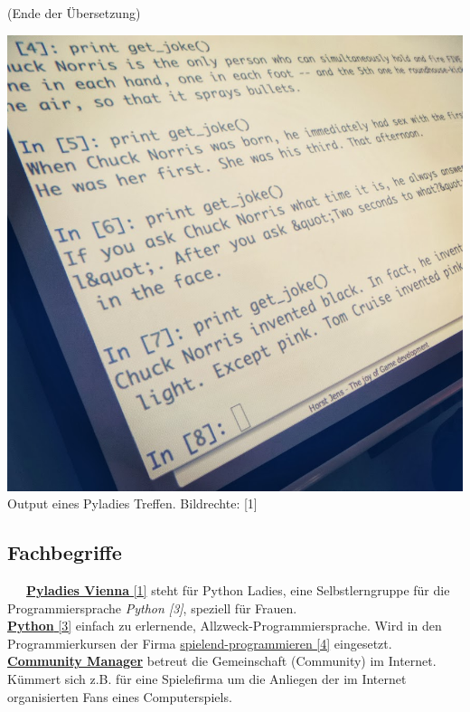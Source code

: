 \documentclass[10pt,a4paper,ngerman,twoside]{article} %
\begin{document}
\begin{multicols}{3}
(Ende der Übersetzung)
\begin{center}
\includegraphics[width=\linewidth]{floor/floor-jokes.jpg} \\
\footnotesize{Output eines Pyladies Treffen. Bildrechte: [1]} 
\end{center}
\subsection*{Fachbegriffe}

~~~\href{https://twitter.com/pyladies_vie}{\textbf{Pyladies Vienna} [1]} steht für Python Ladies, eine Selbstlerngruppe für die Programmiersprache  \textit{Python [3]}, speziell für Frauen. \\

\href{http://python.org}{\textbf{Python} [3]} einfach zu erlernende, Allzweck-Programmiersprache. Wird in den Programmierkursen der Firma \href{http://spielend-programmieren.at}{spielend-programmieren [4]} eingesetzt. \\

\href{http://de.wikipedia.org/wiki/Community_Management}{\textbf{Community Manager}} betreut die Gemeinschaft (Community) im Internet. Kümmert sich z.B. für eine Spielefirma um die Anliegen der im Internet organisierten Fans eines Computerspiels. \\


\end{multicols}
\end{document}
